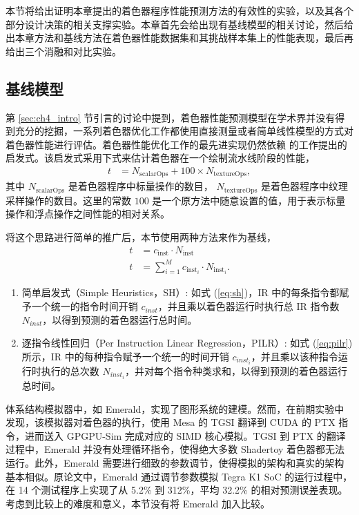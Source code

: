 {\amend 本节将给出证明本章提出的着色器程序性能预测方法的有效性的实验，以及其各个部分设计决策的相关支撑实验。本章首先会给出现有基线模型的相关讨论，然后给出本章方法和基线方法在着色器性能数据集和其挑战样本集上的性能表现，最后再给出三个消融和对比实验。}

\subsection{基线模型}

{\amend 第 \ref{sec:ch4_intro} 节引言的讨论中提到，着色器性能预测模型在学术界并没有得到充分的挖掘，一系列着色器优化工作都使用直接测量或者简单线性模型的方式对着色器性能进行评估。着色器性能优化工作的最先进实现仍然依赖 \citet{10.1145/2816795.2818104} 的工作提出的启发式。}该启发式采用下式来估计着色器在一个绘制流水线阶段的性能，
\begin{align}
t &= N_\text{scalarOps} + 100 \times N_\text{textureOps},
\end{align}
其中 $N_\text{scalarOps}$ 是着色器程序中标量操作的数目， $N_\text{textureOps}$ 是着色器程序中纹理采样操作的数目。这里的常数 $100$ 是一个原方法中随意设置的值，用于表示标量操作和浮点操作之间性能的相对关系。

将这个思路进行简单的推广后，{\amend 本节}使用两种方法来作为基线，
\begin{align}
\label{eq:sh} t &= c_\text{inst} \cdot N_\text{inst} \\
\label{eq:pilr} t &= \sum_{i=1}^{M} c_{\text{inst}_{i}} \cdot N_{\text{inst}_{i}}.
\end{align}

\begin{enumerate}
    \item 简单启发式（Simple Heuristics，SH）: 如式 (\ref{eq:sh})，IR 中的每条指令都赋予一个统一的指令时间开销 $c_{inst}$，并且乘以着色器运行时执行总 IR 指令数 $N_{inst}$，以得到预测的着色器运行总时间。
    \item 逐指令线性回归（Per Instruction Linear Regression，PILR）: 如式 (\ref{eq:pilr}) 所示，IR 中的每种指令赋予一个统一的时间开销 $c_{inst_i}$，并且乘以该种指令运行时执行的总次数 $N_{inst_i}$，并对每个指令种类求和，以得到预测的着色器运行总时间。
\end{enumerate}

{\amend 体系结构模拟器中，如 Emerald\cite{10.1145/3307650.3322221}，实现了图形系统的建模。然而，在前期实验中发现，该模拟器对着色器的执行，使用 Mesa 的 TGSI \cite{TGSI} 翻译到 CUDA 的 PTX 指令，进而送入 GPGPU-Sim 完成对应的 SIMD 核心模拟。TGSI 到 PTX 的翻译过程中，Emerald 并没有处理循环指令，使得绝大多数 Shadertoy 着色器都无法运行。此外，Emerald 需要进行细致的参数调节，使得模拟的架构和真实的架构基本相似。原论文中，Emerald 通过调节参数模拟 Tegra K1 SoC 的运行过程中，在 14 个测试程序上实现了从 5.2\% 到 312\%，平均 32.2\% 的相对预测误差表现。考虑到比较上的难度和意义，本节没有将 Emerald 加入比较。}

